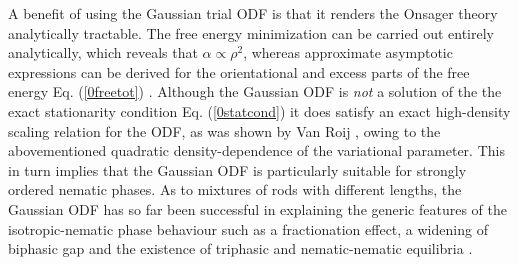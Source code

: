 {A benefit of using the Gaussian trial ODF
is that it renders the Onsager theory analytically tractable.
The free energy minimization can be carried out entirely analytically,
which reveals that $\alpha\propto \rho^{2}$,
whereas approximate asymptotic expressions
can be derived for the orientational and
excess parts of the free energy Eq. (\ref{0freetot}) \cite{Vroege92,OdijkLekkerkerker}.
Although the Gaussian ODF
is {\em not} a solution of the the exact stationarity condition Eq. (\ref{0statcond})
it  does satisfy an exact high-density scaling relation for the
ODF, as was shown by Van Roij \cite{vanroijmulderscaling},
 owing to the abovementioned
quadratic density-dependence of the variational parameter.
This in turn implies that the Gaussian ODF is particularly suitable
for strongly ordered nematic phases.
As to  mixtures of rods with different lengths, the Gaussian ODF
has so far been successful in explaining the generic features of the isotropic-nematic
phase behaviour
such as a fractionation effect, a widening of biphasic gap \cite{OdijkLekkerkerker} and the
existence of triphasic and nematic-nematic equilibria \cite{LekkerVroeg}.








}
